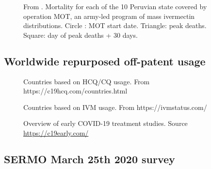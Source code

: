 \documentclass[11pt,a4paper,notitlepage]{report}
\begin{document}
\begin{figure}[h]
    \centering
    \caption{From \citet{Chamie2021}. Mortality for each of the 10 Peruvian state covered by operation MOT, an army-led program of mass ivermectin distributions. Circle : MOT start date. Triangle: peak deaths. Square: day of peak deaths + 30 days.}
    \label{fig:peru-operation-mot}
\end{figure}

\clearpage

\subsection*{Worldwide repurposed off-patent usage}

\begin{figure}[h]
    \centering
    \caption{Countries based on HCQ/CQ usage. From https://c19hcq.com/countries.html}
    \label{fig:hydroxychloroquine-countries}
\end{figure}

\begin{figure}[h]
    \centering
    \caption{Countries based on IVM usage. From https://ivmstatus.com/}
    \label{fig:ivermectin-countries}
\end{figure}

\begin{figure}[h]
    \centering
    \caption{Overview of early COVID-19 treatment studies. Source \href{https://c19early.com/}{https://c19early.com/}}
    \label{fig:C19-early}
\end{figure}

\clearpage

\subsection*{SERMO March 25th 2020 survey}
\end{document}
